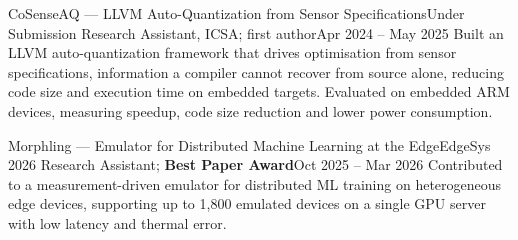     \resumeSubheading
      {CoSenseAQ --- LLVM Auto-Quantization from Sensor Specifications}{Under Submission}
      {Research Assistant, ICSA; first author}{Apr 2024 -- May 2025}
      \resumeItemListStart
          {Built an LLVM auto-quantization framework that drives optimisation from sensor specifications, information a compiler cannot recover from source alone, reducing code size and execution time on embedded targets.}
          {Evaluated on embedded ARM devices, measuring speedup, code size reduction and lower power consumption.}
      \resumeItemListEnd

    \resumeSubheading
      {Morphling --- Emulator for Distributed Machine Learning at the Edge}{EdgeSys 2026}
      {Research Assistant; \textbf{Best Paper Award}}{Oct 2025 -- Mar 2026}
      \resumeItemListStart
          {Contributed to a measurement-driven emulator for distributed ML training on heterogeneous edge devices, supporting up to 1,800 emulated devices on a single GPU server with low latency and thermal error.}
      \resumeItemListEnd

  \resumeSubHeadingListEnd
